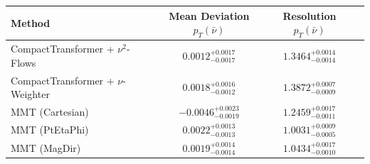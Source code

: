     \begin{tabular}{lccc}
        \toprule
        Method & Mean Deviation $p_{T}(\bar{\nu})$ & Resolution $p_{T}(\bar{\nu})$ \\
        \midrule
        CompactTransformer + $\nu^2$-Flows & $0.0012^{+0.0017}_{-0.0017}$ & $1.3464^{+0.0014}_{-0.0014}$ \\
        CompactTransformer + $\nu$-Weighter & $0.0018^{+0.0016}_{-0.0012}$ & $1.3872^{+0.0007}_{-0.0009}$ \\
        MMT (Cartesian) & $-0.0046^{+0.0023}_{-0.0019}$ & $1.2459^{+0.0017}_{-0.0011}$ \\
        MMT (PtEtaPhi) & $0.0022^{+0.0013}_{-0.0013}$ & $1.0031^{+0.0009}_{-0.0005}$ \\
        MMT (MagDir) & $0.0019^{+0.0014}_{-0.0014}$ & $1.0434^{+0.0017}_{-0.0010}$ \\
        \bottomrule
    \end{tabular}